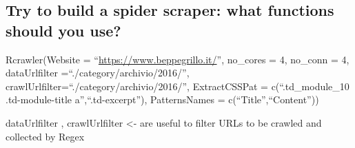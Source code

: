 \documentclass[
]{article}
\begin{document}
\hypertarget{try-to-build-a-spider-scraper-what-functions-should-you-use}{%
\subsection{Try to build a spider scraper: what functions should you
use?}\label{try-to-build-a-spider-scraper-what-functions-should-you-use}}

Rcrawler(Website = ``\url{https://www.beppegrillo.it/}'', no\_cores = 4,
no\_conn = 4, dataUrlfilter =``./category/archivio/2016/'',
crawlUrlfilter=``./category/archivio/2016/'', ExtractCSSPat =
c(``.td\_module\_10 .td-module-title a'',``.td-excerpt''), PatternsNames
= c(``Title'',``Content''))

dataUrlfilter , crawlUrlfilter \textless- are useful to filter URLs to
be crawled and collected by Regex
\end{document}
